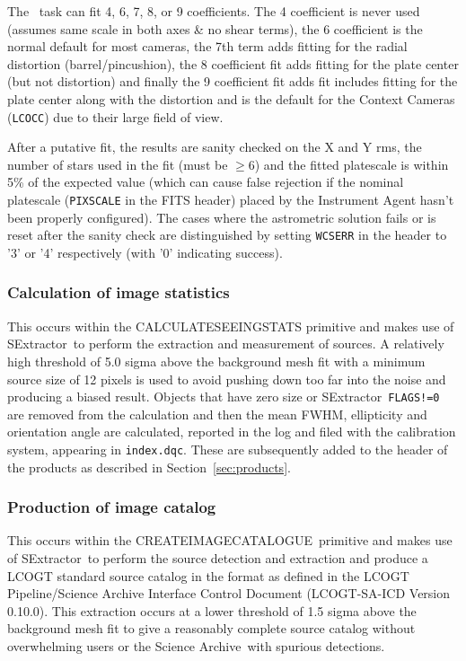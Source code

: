 \documentclass[twoside,11pt]{article}
\newcommand{\htmladdnormallink}[2]{#1}
\newcommand{\xref}[3]{#1}
\renewcommand{\_}{\texttt{\symbol{95}}}
\newcommand{\ASTROM}{\xref{{\sc{Astrom}}}{sun5}{}}
\newcommand{\SEx}{{\sc SExtractor}}
\newcommand{\task}[1]{\textsf{#1}}
\newcommand{\SAICDFull}{LCOGT Pipeline/Science Archive Interface Control
Document (LCOGT-SA-ICD Version 0.10.0)}
\newcommand{\SA}{Science Archive}
\begin{document}
The \ASTROM\ task can fit  4, 6, 7, 8, or 9 coefficients. The 4 coefficient is
never used (assumes same scale in both axes \& no shear terms), the 6
coefficient is the normal default for most cameras, the 7th term adds fitting
for the radial distortion (barrel/pincushion), the 8 coefficient fit adds
fitting for the plate center (but not distortion) and finally the 9 coefficient fit adds
fit includes fitting for the plate center along with the distortion and is the
default for the Context Cameras (\texttt{LCOCC}) due to their large field of
view.

After a putative fit, the results are sanity checked on the X and Y rms, the
number of stars used in the fit (must be $\geq$6) and the fitted platescale is
within 5\% of the expected value (which can cause false rejection if the nominal
platescale (\texttt{PIXSCALE} in the FITS header) placed by the Instrument Agent
hasn't been properly configured). The cases where the astrometric solution fails
or is reset after the sanity check are distinguished by setting \texttt{WCSERR}
in the header to '3' or '4' respectively (with '0' indicating success).

\subsubsection{Calculation of image statistics}

This occurs within the \task{\_CALCULATE\_SEEING\_STATS\_} primitive and makes
use of \SEx\ to perform the extraction and measurement of sources. A relatively
high threshold of 5.0 sigma above the background mesh fit with a minimum source
size of 12 pixels is used to avoid pushing down too far into the noise and
producing a biased result. Objects that have zero size or \SEx\
\texttt{FLAGS!=0} are removed from the calculation and then the mean FWHM,
ellipticity and orientation angle are calculated, reported in the log and filed
with the calibration system, appearing in \texttt{index.dqc}. These are subsequently
added to the header of the products as described in Section~\ref{sec:products}.

\subsubsection{Production of image catalog}

This occurs within the \task{\_CREATE\_IMAGE\_CATALOGUE\_}\ primitive and makes
use of \SEx\ to perform the source detection and extraction and produce a LCOGT
standard source catalog in the format as defined in the
\htmladdnormallink{\SAICDFull}{http://intranet.lco.gtn/Science_Archive#Interface_Control_Document_.28ICD.29}. This
extraction occurs at a lower threshold of 1.5 sigma above the background mesh
fit to give a reasonably complete source catalog without overwhelming users or
the \SA\ with spurious detections.
\end{document}
